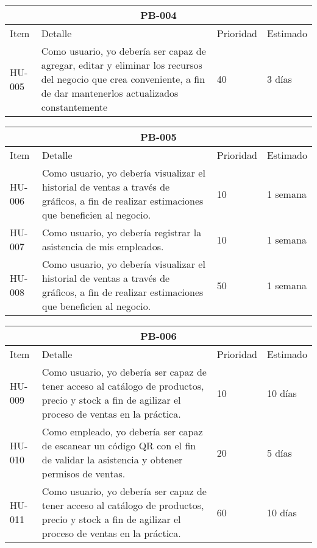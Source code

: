 \begin{table}[htbp]
	\begin{center}
		\begin{tabular}{| p{1.5cm} |p{9cm} | p{1.6cm} | p{1.6cm}|}
			\hline
			\multicolumn{4}{|c|}{PB-004}\\
			\hline
			Item & Detalle & Prioridad & Estimado \\
			\hline
			HU-005 & Como usuario, yo debería ser capaz de agregar, editar y eliminar los recursos del negocio que crea conveniente, a fin de dar mantenerlos actualizados constantemente& 40 & 3 días \\
			\hline	
		\end{tabular}
	\end{center}
\end{table}

\begin{table}[htbp]
	\begin{center}
		\begin{tabular}{| p{1.5cm} |p{9cm} | p{1.6cm} | p{1.6cm}|}
			\hline
			\multicolumn{4}{|c|}{PB-005}\\
			\hline
			Item & Detalle & Prioridad & Estimado \\
			\hline
			HU-006 & Como usuario, yo debería visualizar el historial de ventas a través de gráficos, a fin de realizar estimaciones que beneficien al negocio. & 10 & 1 semana \\
			\hline
			HU-007 & Como usuario, yo debería registrar la asistencia de mis empleados. & 10 & 1 semana \\
			\hline
			HU-008 & Como usuario, yo debería visualizar el historial de ventas a través de gráficos, a fin de realizar estimaciones que beneficien al negocio. & 50 & 1 semana \\
			\hline	
		\end{tabular}
	\end{center}
\end{table}

\begin{table}[htbp]
	\begin{center}
		\begin{tabular}{| p{1.5cm} |p{9cm} | p{1.6cm} | p{1.6cm}|}
			\hline
			\multicolumn{4}{|c|}{PB-006}\\
			\hline
			Item & Detalle & Prioridad & Estimado \\
			\hline
			HU-009 & Como usuario, yo debería ser capaz de tener acceso al catálogo de productos, precio y stock a fin de agilizar el proceso de ventas en la práctica. & 10 & 10 días \\
			\hline
			HU-010 & Como empleado, yo debería ser capaz de escanear un código QR con el fin de validar la asistencia y obtener permisos de ventas. & 20 & 5 días \\
			\hline
			HU-011 & Como usuario, yo debería ser capaz de tener acceso al catálogo de productos, precio y stock a fin de agilizar el proceso de ventas en la práctica. & 60 & 10 días \\
			\hline	
		\end{tabular}
	\end{center}
\end{table}

